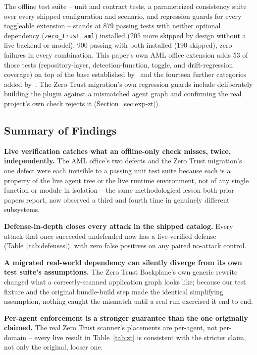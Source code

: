 \documentclass[conference]{IEEEtran}
\begin{document}
The offline test suite -- unit and contract tests, a parametrized consistency suite over every shipped configuration and scenario, and regression guards for every toggleable extension -- stands at 879 passing tests with neither optional dependency (\texttt{zero\_trust}, \texttt{aml}) installed (205 more skipped by design without a live backend or model), 900 passing with both installed (190 skipped), zero failures in every combination. This paper's own AML office extension adds 53 of those tests (repository-layer, detection-function, toggle, and drift-regression coverage) on top of the base established by~\cite{mantis_paper1} and the fourteen further categories added by~\cite{mantis_paper2}. The Zero Trust migration's own regression guards include deliberately building the plugin against a mismatched agent graph and confirming the real project's own check rejects it (Section~\ref{sec:exp-zt}).

\subsection{Summary of Findings}
\label{sec:exp-summary}

\textbf{Live verification catches what an offline-only check misses, twice, independently.} The AML office's two defects and the Zero Trust migration's one defect were each invisible to a passing unit test suite because each is a property of the live agent tree or the live runtime environment, not of any single function or module in isolation -- the same methodological lesson both prior papers report, now observed a third and fourth time in genuinely different subsystems.

\textbf{Defense-in-depth closes every attack in the shipped catalog.} Every attack that once succeeded undefended now has a live-verified defense (Table~\ref{tab:defenses}), with zero false positives on any paired no-attack control.

\textbf{A migrated real-world dependency can silently diverge from its own test suite's assumptions.} The Zero Trust Backplane's own generic rewrite changed what a correctly-scanned application graph looks like; because our test fixture and the original bundle-build step made the identical simplifying assumption, nothing caught the mismatch until a real run exercised it end to end.

\textbf{Per-agent enforcement is a stronger guarantee than the one originally claimed.} The real Zero Trust scanner's placements are per-agent, not per-domain -- every live result in Table~\ref{tab:zt} is consistent with the stricter claim, not only the original, looser one.
\end{document}
